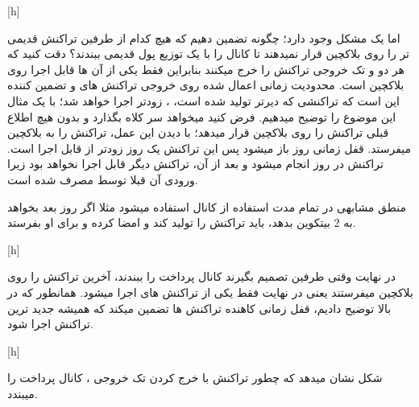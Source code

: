 [h]

اما یک مشکل وجود دارد؛ چگونه تضمین دهیم که هیچ کدام از طرفین تراکنش قدیمی تر  را روی بلاکچین قرار نمیدهند تا کانال را با یک توزیع پول قدیمی ببندند؟ دقت کنید که هر دو  و  تک خروجی تراکنش  را خرج میکنند بنابراین فقط یکی از آن ها قابل اجرا روی بلاکچین است. محدودیت زمانی اعمال شده روی خروجی تراکنش های  و  تضمین کننده این است که تراکنشی که دیرتر تولید شده است، ، زودتر اجرا خواهد شد؛ با یک مثال این موضوع را توضیح میدهیم. فرض کنید  میخواهد سر  کلاه بگذارد و بدون هیچ اطلاع قبلی تراکنش  را روی بلاکچین قرار میدهد؛  با دیدن این عمل، تراکنش    را به بلاکچین میفرستد. قفل زمانی   روز  باز میشود پس این تراکنش یک روز زودتر از  قابل اجرا است. تراکنش   در روز  انجام میشود و بعد از آن، تراکنش  دیگر قابل اجرا نخواهد بود زیرا ورودی آن قبلا توسط   مصرف شده است.

منطق مشابهی در تمام مدت استفاده از کانال استفاده میشود مثلا اگر روز بعد  بخواهد به  2 بیتکوین بدهد، باید تراکنش  را تولید کند و امضا کرده و برای او بفرستد.

[h]

در نهایت وقتی طرفین تصمیم بگیرند کانال پرداخت را ببندند، آخرین تراکنش را روی بلاکچین میفرستند یعنی در نهایت فقط یکی از تراکنش های     اجرا میشود. همانطور که در بالا توضیح دادیم، قفل زمانی کاهنده تراکنش ها تضمین میکند که همیشه جدید ترین تراکنش اجرا شود.

[h]

شکل  نشان میدهد که چطور تراکنش  با خرج کردن تک خروجی ، کانال پرداخت را میبندد.



